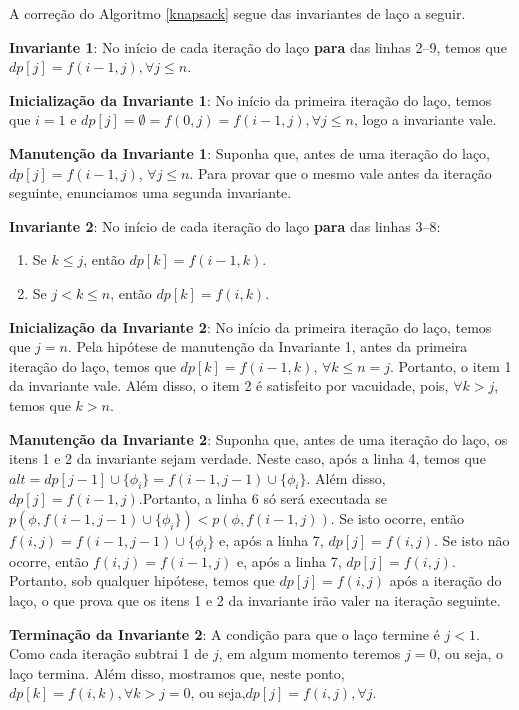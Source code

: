 \indent

A correção do Algoritmo \ref{knapsack} segue das invariantes de laço a seguir.

\textbf{Invariante 1}: No início de cada iteração do laço \textbf{para} das linhas 2--9, temos que $dp[j] = f(i-1,j), \forall j \leq n$.

\textbf{Inicialização da Invariante 1}: No início da primeira iteração do laço, temos que $i = 1$ e $dp[j] = \emptyset = f(0,j) = f(i-1,j), \forall j \leq n$, logo a invariante vale.

\textbf{Manutenção da Invariante 1}: Suponha que, antes de uma iteração do laço,\break $dp[j] = f(i-1,j)$, $\forall j \leq n$. Para provar que o mesmo vale antes da iteração seguinte, enunciamos uma segunda invariante.

\textbf{Invariante 2}: No início de cada iteração do laço \textbf{para} das linhas 3--8:
\begin{enumerate}
	\item Se $k \leq j$, então $dp[k] = f(i-1,k)$.
	\item Se $j < k \leq n$, então $dp[k] = f(i,k)$.
\end{enumerate}

\textbf{Inicialização da Invariante 2}: No início da primeira iteração do laço, temos que $j = n$. Pela hipótese de manutenção da Invariante 1, antes da primeira iteração do laço, temos que $dp[k] = f(i-1,k)$, $\forall k \leq n = j$. Portanto, o item 1 da invariante vale. Além disso, o item 2 é satisfeito por vacuidade, pois, $\forall k > j$, temos que $k > n$.

\textbf{Manutenção da Invariante 2}: Suponha que, antes de uma iteração do laço, os itens 1 e 2 da invariante sejam verdade. Neste caso, após a linha 4, temos que\break $alt = dp[j-1] \cup \{\phi_i \} = f(i-1,j-1) \cup \{\phi_i \}$. Além disso, $dp[j] = f(i-1,j)$.\break Portanto, a linha 6 só será executada se $p(\phi,f(i-1,j-1) \cup \{\phi_i \}) < p(\phi,f(i-1,j))$. Se isto ocorre, então $f(i,j) = f(i-1,j-1) \cup \{\phi_i \}$ e, após a linha 7, $dp[j] = f(i,j)$. Se isto não ocorre, então $f(i,j) = f(i-1,j)$ e, após a linha 7, $dp[j] = f(i,j)$. Portanto, sob qualquer hipótese, temos que $dp[j] = f(i,j)$ após a iteração do laço, o que prova que os itens 1 e 2 da invariante irão valer na iteração seguinte.

\textbf{Terminação da Invariante 2}: A condição para que o laço termine é $j < 1$. Como cada iteração subtrai 1 de $j$, em algum momento teremos $j = 0$, ou seja, o laço termina. Além disso, mostramos que, neste ponto, $dp[k] = f(i,k), \forall k > j = 0$, ou seja,\break $dp[j] = f(i,j), \forall j$.

